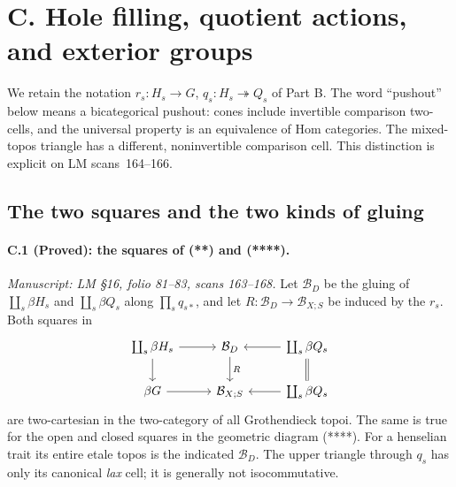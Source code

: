 \section{C. Hole filling, quotient actions, and exterior groups}\label{part:C}

We retain the notation $r_s:H_s\to G$, $q_s:H_s\twoheadrightarrow Q_s$
of Part B. The word ``pushout'' below means a bicategorical
pushout: cones include invertible comparison two-cells, and
the universal property is an equivalence of Hom categories.
The mixed-topos triangle has a different, noninvertible
comparison cell. This distinction is explicit on LM
scans~164--166.

\subsection{The two squares and the two kinds of gluing}

\paragraph{C.1 (Proved): the squares of (**) and (****).}\label{C1}
\textit{Manuscript: LM \S16, folio 81--83, scans 163--168.}
Let $\mathcal B_D$ be the gluing of $\coprod_s\beta H_s$ and
$\coprod_s\beta Q_s$ along $\prod_s q_{s*}$, and let
$R:\mathcal B_D\to\mathcal B_{X;S}$ be induced by the $r_s$.
Both squares in
\[
\begin{tikzcd}[column sep=2.6em]
 \coprod_s\beta H_s\ar[r]\ar[d]&\mathcal B_D\ar[d,"R"]
                      &\coprod_s\beta Q_s\ar[l]\ar[d,equal]\\
 \beta G\ar[r]&\mathcal B_{X;S}&\coprod_s\beta Q_s\ar[l]
\end{tikzcd}
\]
are two-cartesian in the two-category of all Grothendieck
topoi. The same is true for the open and closed squares in
the geometric diagram (****). For a henselian trait its
entire etale topos is the indicated $\mathcal B_D$.
The upper triangle through $q_s$ has only its canonical
\emph{lax} cell; it is generally not isocommutative.

